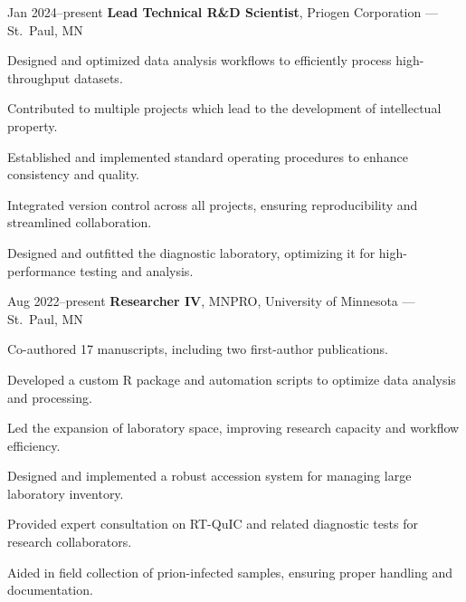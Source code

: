 \documentclass{resume}
\begin{document}
        \begin{twocolentry}{Jan 2024--present}
            \textbf{Lead Technical R\&D Scientist}, Priogen Corporation --- St.\ Paul, MN
        \end{twocolentry}
        \begin{onecolentry}
            \begin{highlights}
                \item Designed and optimized data analysis workflows to efficiently process high-throughput datasets.
                \item Contributed to multiple projects which lead to the development of intellectual property.
                \item Established and implemented standard operating procedures to enhance consistency and quality.
                \item Integrated version control across all projects, ensuring reproducibility and streamlined collaboration.
                \item Designed and outfitted the diagnostic laboratory, optimizing it for high-performance testing and analysis.
            \end{highlights}
        \end{onecolentry}

        \begin{twocolentry}{Aug 2022--present}
            \textbf{Researcher IV}, MNPRO, University of Minnesota --- St.\ Paul, MN
        \end{twocolentry}
        \begin{onecolentry}
            \begin{highlights}
                \item Co-authored 17 manuscripts, including two first-author publications.
                \item Developed a custom R package and automation scripts to optimize data analysis and processing.
                \item Led the expansion of laboratory space, improving research capacity and workflow efficiency.
                \item Designed and implemented a robust accession system for managing large laboratory inventory.
                \item Provided expert consultation on RT-QuIC and related diagnostic tests for research collaborators.
                \item Aided in field collection of prion-infected samples, ensuring proper handling and documentation.
            \end{highlights}
        \end{onecolentry}
\end{document}
